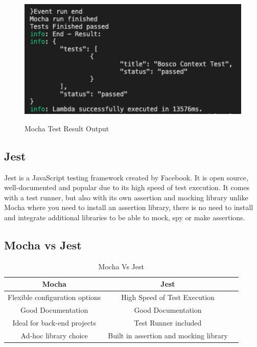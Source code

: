 \documentclass[12pt,a4paper,titlepage]{report}
\begin{document}
\begin{figure}[ht]
  \centering
  {\includegraphics[width=15cm]{./diagrams/mocha_test_result}}
  \caption{Mocha Test Result Output}
\end{figure}

\subsection{Jest}

Jest is a JavaScript testing framework created by Facebook. It is open source, well-documented and popular due to its
high speed of test execution. It comes with a test runner, but also with its own assertion and mocking library unlike Mocha where you need to install an assertion
library, there is no need to install and integrate additional libraries to be able to mock, spy or make assertions.

\subsection{Mocha vs Jest}

\begin{table}[H]
  \centering
  \small
  \setlength\tabcolsep{6pt}
  \begin{tabular}{|c|c|c}
    \hline \textbf
    {Mocha}              & \textbf {Jest}               \\
    \hline\hline
    Flexible configuration options & High Speed of Test Execution           \\
    \hline
    Good Documentation             & Good Documentation                     \\
    \hline
    Ideal for back-end projects    & Test Runner included                   \\
    \hline
    Ad-hoc library choice          & Built in assertion and mocking library \\
    \hline
  \end{tabular}
  \caption{Mocha Vs Jest}
  \label{table:mocha:jest}
\end{table}
\end{document}
